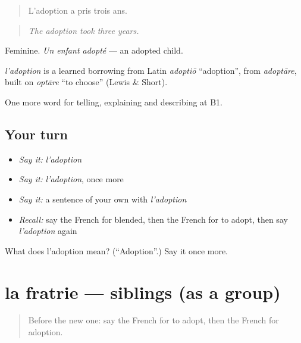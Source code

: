 \begin{quote}
L'adoption a pris trois ans.
\end{quote}

\begin{quote}
\emph{The adoption took three years.}
\end{quote}

Feminine. \emph{Un enfant adopté} — an adopted child.

\begin{cousinweb}
\emph{l'adoption} is a learned borrowing from Latin \emph{adoptiō} \textquotedblleft{}adoption\textquotedblright{}, from \emph{adoptāre}, built on \emph{optāre} \textquotedblleft{}to choose\textquotedblright{} (Lewis \& Short).
\end{cousinweb}

\begin{grammarlens}[title={What you've built}]
One more word for telling, explaining and describing at B1.
\end{grammarlens}

\subsection*{Your turn}
\begin{itemize}
\raggedright
  \item \emph{Say it:} \emph{l'adoption}
  \item \emph{Say it:} \emph{l'adoption}, once more
  \item \emph{Say it:} a sentence of your own with \emph{l'adoption}
  \item \emph{Recall:} say the French for blended, then the French for to adopt, then say \emph{l'adoption} again
\end{itemize}

\begin{tcolorbox}[breakable,colback=teal!4,colframe=teal!35!black,title={Before you move on}]
What does l'adoption mean? (\textquotedblleft{}Adoption\textquotedblright{}.) Say it once more.
\end{tcolorbox}
\section[la fratrie]{la fratrie — siblings (as a group)}

\label{lesson:FR-C492-fratrie}



\begin{quote}
Before the new one: say the French for to adopt, then the French for adoption.
\end{quote}

